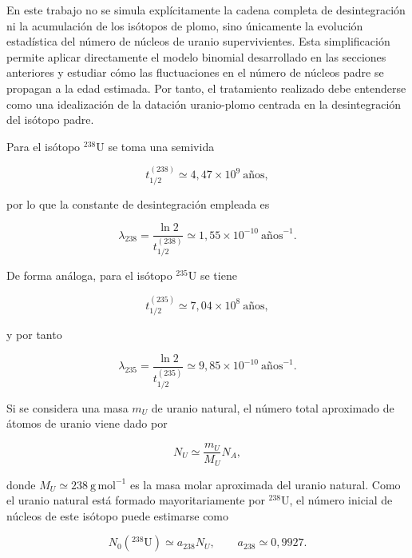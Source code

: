 \documentclass[12pt,a4paper]{article}
\begin{document}
En este trabajo no se simula explícitamente la cadena completa de desintegración ni la acumulación de los isótopos de plomo, sino únicamente la evolución estadística del número de núcleos de uranio supervivientes. Esta simplificación permite aplicar directamente el modelo binomial desarrollado en las secciones anteriores y estudiar cómo las fluctuaciones en el número de núcleos padre se propagan a la edad estimada. Por tanto, el tratamiento realizado debe entenderse como una idealización de la datación uranio-plomo centrada en la desintegración del isótopo padre.

Para el isótopo $^{238}\text{U}$ se toma una semivida

\begin{equation}
t_{1/2}^{(238)} \simeq 4{,}47\times 10^9~\text{años},
\end{equation}

por lo que la constante de desintegración empleada es

\begin{equation}
\lambda_{238}
=
\frac{\ln 2}{t_{1/2}^{(238)}}
\simeq
1{,}55\times 10^{-10}~\text{años}^{-1}.
\end{equation}

De forma análoga, para el isótopo $^{235}\text{U}$ se tiene

\begin{equation}
t_{1/2}^{(235)} \simeq 7{,}04\times 10^8~\text{años},
\end{equation}

y por tanto

\begin{equation}
\lambda_{235}
=
\frac{\ln 2}{t_{1/2}^{(235)}}
\simeq
9{,}85\times 10^{-10}~\text{años}^{-1}.
\end{equation}

Si se considera una masa $m_U$ de uranio natural, el número total aproximado de átomos de uranio viene dado por

\begin{equation}
N_U
\simeq
\frac{m_U}{M_U}N_A,
\end{equation}

donde $M_U\simeq 238~\mathrm{g\,mol^{-1}}$ es la masa molar aproximada del uranio natural. Como el uranio natural está formado mayoritariamente por $^{238}\text{U}$, el número inicial de núcleos de este isótopo puede estimarse como

\begin{equation}
N_0({}^{238}\text{U})
\simeq
a_{238}N_U,
\qquad
a_{238}\simeq 0{,}9927.
\end{equation}
\end{document}

